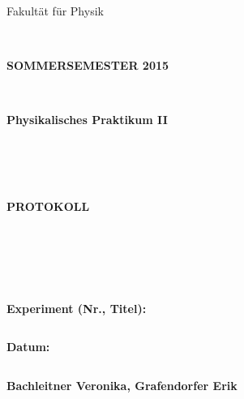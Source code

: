 \documentclass{article}
\begin{document}
\thispagestyle{empty}
			\begin{center}
			\Large{Fakultät für Physik}\\
			\end{center}
\begin{verbatim}


\end{verbatim}
			\begin{center}
			\textbf{\LARGE SOMMERSEMESTER 2015}
			\end{center}
\begin{verbatim}


\end{verbatim}
			\begin{center}
			\textbf{\LARGE{Physikalisches Praktikum II}}
			\end{center}
\begin{verbatim}




\end{verbatim}

			\begin{center}
			\textbf{\LARGE{PROTOKOLL}}
			\end{center}
			
\begin{verbatim}





\end{verbatim}

			\begin{flushleft}
			\textbf{\Large{Experiment (Nr., Titel):}}\\
			\LARGE{}	
			\end{flushleft}

\begin{verbatim}

\end{verbatim}	
			\begin{flushleft}
			\textbf{\Large{Datum:}} \Large{}
			\end{flushleft}
			
\begin{verbatim}
\end{verbatim}
		\begin{flushleft}
			\textbf{\Large{Bachleitner Veronika, Grafendorfer Erik}} 
			\end{flushleft}
\end{document}
